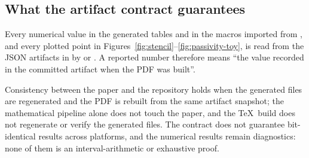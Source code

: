 \subsection{What the artifact contract guarantees}
\begin{remark}
Every numerical value in the generated tables and in the macros imported from , and every plotted point in Figures~\ref{fig:stencil}--\ref{fig:passivity-toy}, is read from the JSON artifacts in  by  or .
A reported number therefore means ``the value recorded in the committed artifact when the PDF was built''.
\end{remark}

Consistency between the paper and the repository holds when the generated files are regenerated and the PDF is rebuilt from the same artifact snapshot; the mathematical pipeline alone does not touch the paper, and the \TeX\ build does not regenerate or verify the generated files.
The contract does not guarantee bit-identical results across platforms, and the numerical results remain diagnostics: none of them is an interval-arithmetic or exhaustive proof.
